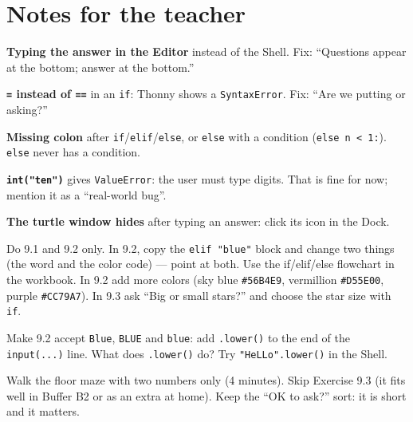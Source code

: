 \section{Notes for the teacher}
\begin{commonmistakes}
  \item \textbf{Typing the answer in the Editor} instead of the Shell. Fix: \enquote{Questions appear at the bottom; answer at the bottom.}
  \item \textbf{\texttt{=} instead of \texttt{==}} in an \texttt{if}: Thonny shows a \texttt{SyntaxError}. Fix: \enquote{Are we putting or asking?}
  \item \textbf{Missing colon} after \texttt{if}/\texttt{elif}/\texttt{else}, or \texttt{else} with a condition (\texttt{else n < 1:}). \texttt{else} never has a condition.
  \item \textbf{\texttt{int("ten")}} gives \texttt{ValueError}: the user must type digits. That is fine for now; mention it as a \enquote{real-world bug}.
  \item \textbf{The turtle window hides} after typing an answer: click its icon in the Dock.
\end{commonmistakes}
\begin{differentiation}
\supportpath Do 9.1 and 9.2 only. In 9.2, copy the \texttt{elif "blue"} block and change two things (the word and the color code) --- point at both. Use the if/elif/else flowchart in the workbook.
\extensionpath In 9.2 add more colors (sky blue \texttt{\#56B4E9}, vermillion \texttt{\#D55E00}, purple \texttt{\#CC79A7}). In 9.3 ask \enquote{Big or small stars?} and choose the star size with \texttt{if}.
\end{differentiation}
\begin{stretchchallenge}
Make 9.2 accept \texttt{Blue}, \texttt{BLUE} and \texttt{blue}: add \texttt{.lower()} to the end of the \texttt{input(...)} line. What does \texttt{.lower()} do? Try \texttt{"HeLLo".lower()} in the Shell.
\end{stretchchallenge}
\begin{teachernote}
Walk the floor maze with two numbers only (4 minutes). Skip Exercise 9.3 (it fits well in Buffer B2 or as an extra at home). Keep the \enquote{OK to ask?} sort: it is short and it matters.
\end{teachernote}
